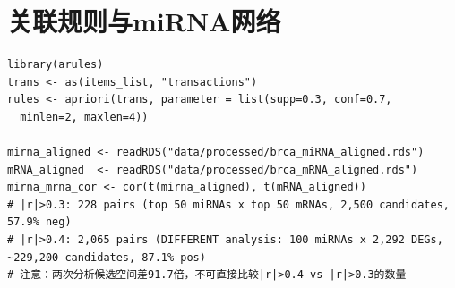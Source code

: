 \documentclass[12pt,a4paper,openany]{ctexbook}
\begin{document}
\section{关联规则与miRNA网络}
\begin{lstlisting}[caption={Apriori关联规则与miRNA-mRNA相关}, basicstyle=\ttfamily\scriptsize]
library(arules)
trans <- as(items_list, "transactions")
rules <- apriori(trans, parameter = list(supp=0.3, conf=0.7,
  minlen=2, maxlen=4))

mirna_aligned <- readRDS("data/processed/brca_miRNA_aligned.rds")
mRNA_aligned  <- readRDS("data/processed/brca_mRNA_aligned.rds")
mirna_mrna_cor <- cor(t(mirna_aligned), t(mRNA_aligned))
# |r|>0.3: 228 pairs (top 50 miRNAs x top 50 mRNAs, 2,500 candidates, 57.9% neg)
# |r|>0.4: 2,065 pairs (DIFFERENT analysis: 100 miRNAs x 2,292 DEGs, ~229,200 candidates, 87.1% pos)
# 注意：两次分析候选空间差91.7倍，不可直接比较|r|>0.4 vs |r|>0.3的数量
\end{lstlisting}
\end{document}
